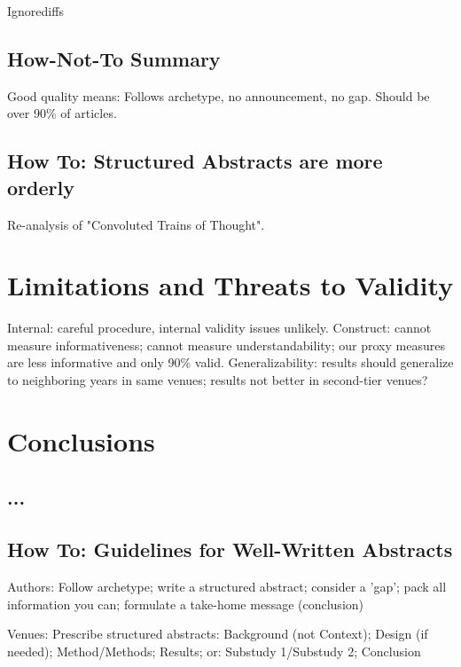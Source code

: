 \documentclass[10pt,journal,compsoc]{IEEEtran}
\begin{document}
\noindent
Ignorediffs


\subsection{How-Not-To Summary}

\noindent
Good quality means: Follows archetype, no announcement, no gap.
Should be over 90\% of articles.


\subsection{How To: Structured Abstracts are more orderly}

\noindent
Re-analysis of "Convoluted Trains of Thought". 




\section{Limitations and Threats to Validity}

\noindent
Internal: careful procedure, internal validity issues unlikely.
Construct: cannot measure informativeness; cannot measure understandability;
our proxy measures are less informative and only 90\% valid.
Generalizability: 
results should generalize to neighboring years in same venues;
results not better in second-tier venues?


\section{Conclusions}


\subsection{...}
\noindent


\subsection{How To: Guidelines for Well-Written Abstracts}

\noindent
Authors: Follow archetype; write a structured abstract; consider a 'gap'; pack all information you can; formulate a take-home message (conclusion)

Venues: Prescribe structured abstracts: Background (not Context); Design (if needed); Method/Methods; Results; or: Substudy 1/Substudy 2; Conclusion
\end{document}
